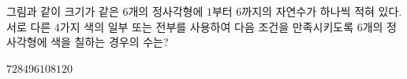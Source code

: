 \hspace*{2mm}\begin{minipage}[t]{\dimexpr\linewidth-2mm\relax}\vspace{0pt}
\noindent\begin{minipage}[t]{0.58\linewidth}\vspace{0pt}\raggedright 그림과 같이 크기가 같은 $6$개의 정사각형에 $1$부터 $6$까지의 자연수가 하나씩 적혀 있다. 서로 다른 $4$가지 색의 일부 또는 전부를 사용하여 다음 조건을 만족시키도록 $6$개의 정사각형에 색을 칠하는 경우의 수는?  \end{minipage}\hfill\begin{minipage}[t]{0.4\linewidth}\vspace{0pt}\centering \resizebox{\ifdim\width>\linewidth\linewidth\else\width\fi}{!}{}\end{minipage}\par
\noindent {}
\begin{choices32}{$72$}{$84$}{$96$}{$108$}{$120$}\end{choices32}\end{minipage}
